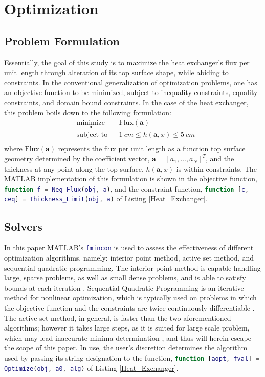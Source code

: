 \documentclass{article}
\begin{document}
\section{Optimization}
\subsection{Problem Formulation}
Essentially, the goal of this study is to maximize the heat exchanger's flux per unit length through alteration of its top surface shape, while abiding to constraints. In the conventional generalization of optimization problems, one has an objective function to be minimized, subject to inequality constraints, equality constraints, and domain bound constraints. In the case of the heat exchanger, this problem boils down to the following formulation:
\begin{equation}
\begin{aligned}
& \underset{\mathbf{a}}{\text{minimize}}
& & \mathrm{Flux}(\mathbf{a}) \\
& \text{subject to}
& & 1~cm \leq h(\mathbf{a},x) \leq 5~cm\\
\end{aligned}
\end{equation}
where $\mathrm{Flux}(\mathbf{a})$ represents the flux per unit length as a function top surface geometry determined by the coefficient vector, $\mathbf{a} = \left[ a_1, \dots, a_N \right] ^T$, and the thickness at any point along the top surface, $h(\mathbf{a}, x)$ is within constraints. The MATLAB implementation of this formulation is shown in the objective function, \lstinline[language=matlab]{function f = Neg_Flux(obj, a)}, and the constraint function, \lstinline[language=MATLAB]{function [c, ceq] = Thickness_Limit(obj, a)} of Listing \ref{Heat_Exchanger}.

\subsection{Solvers}
In this paper MATLAB's \lstinline[language=MATLAB]{fmincon} is used to assess the effectiveness of different optimization algorithms, namely: interior point method, active set method, and sequential quadratic programming. The interior point method is capable handling large, sparse problems, as well as small dense problems, and is able to satisfy bounds at each iteration \cite{Nemirovski2008}. Sequential Quadratic Programming is an iterative method for nonlinear optimization, which is typically used on problems in which the objective function and the constraints are twice continuously differentiable \cite{Boggs1995}. The active set method, in general, is faster than the two aforementioned algorithms; however it takes large steps, as it is suited for large scale problem, which may lead inaccurate minima determination \cite{Leyffer2005}, and thus will herein escape the scope of this paper. In use, the user's discretion determines the algorithm used by passing its string designation to the function, \lstinline[language=MATLAB]{function [aopt, fval] = Optimize(obj, a0, alg)} of Listing \ref{Heat_Exchanger}.
\end{document}
